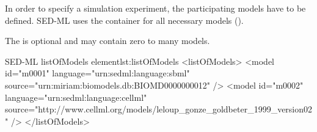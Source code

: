 \label{sec:listOfModels}
In order to specify a simulation experiment, the participating models have to be defined. SED-ML uses the  container for all necessary models (). 

%

The  is optional and may contain zero to many models. 
%
\begin{myXmlLst}{SED-ML listOfModels element}{lst:listOfModels}
<listOfModels>
 <model id="m0001" language="urn:sedml:language:sbml" 
  source="urn:miriam:biomodels.db:BIOMD0000000012" />
 <model id="m0002" language="urn:sedml:language:cellml" 
  source="http://www.cellml.org/models/leloup_gonze_goldbeter_1999_version02" />
</listOfModels>
\end{myXmlLst}
%



